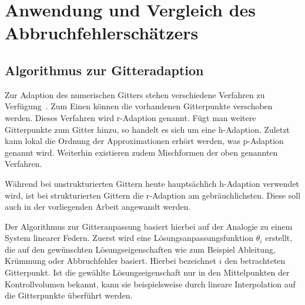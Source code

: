 \chapter{Anwendung und Vergleich des Abbruchfehlerschätzers}

\section{Algorithmus zur Gitteradaption}

Zur Adaption des numerischen Gitters stehen verschiedene Verfahren zu Verfügung~\cite{roy2}.
Zum Einen können die vorhandenen Gitterpunkte verschoben werden. Dieses Verfahren wird r-Adaption
genannt. Fügt man weitere Gitterpunkte zum Gitter hinzu, so handelt es sich um eine h-Adaption.
Zuletzt kann lokal die Ordnung der Approximationen erhört werden, was p-Adaption genannt wird.
Weiterhin existieren zudem Mischformen der oben genannten Verfahren.

Während bei unstrukturierten Gittern heute hauptsächlich h-Adaption verwendet wird, ist bei
strukturierten Gittern die r-Adaption am gebräuchlichsten. Diese soll auch in der vorliegenden
Arbeit angewandt werden.

Der Algorithmus zur Gitteranpassung basiert hierbei auf der Analogie zu einem System
linearer Federn.
Zuerst wird eine Lösungsanpassungsfunktion $\theta_i$ erstellt, die auf den gewünschten
Lösungseigenschaften wie zum Beispiel Ableitung, Krümmung oder Abbruchfehler basiert. Hierbei
bezeichnet $i$ den betrachteten Gitterpunkt. Ist die gewählte Lösungseigenschaft nur in den
Mittelpunkten der Kontrollvolumen bekannt, kann sie beispielsweise durch lineare Interpolation
auf die Gitterpunkte überführt werden.

